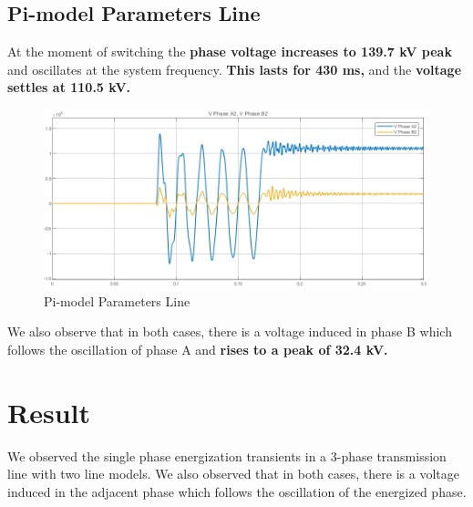 \documentclass[12pt]{article}
\begin{document}
    \subsection{Pi-model Parameters Line}
    At the moment of switching the {\bf phase voltage increases to 139.7 kV peak} and
    oscillates at the system frequency. {\bf This lasts for 430 ms,} and
    the {\bf voltage settles at 110.5 kV.}
    \begin{figure}[H]
      \centering
      \includegraphics[width=5in]{img/scope_b.png}
      \caption{Pi-model Parameters Line}
      \label{scope_b}
    \end{figure}
  
  We also observe that in both cases, there is a voltage induced in phase B which
  follows the oscillation of phase A and {\bf rises to a peak of 32.4 kV.}

  \section{Result}
  We observed the single phase energization transients in a 3-phase transmission
  line with two line models.
  We also observed that in both cases, there is a voltage induced in the adjacent
  phase which follows the oscillation of the energized phase.
\end{document}
